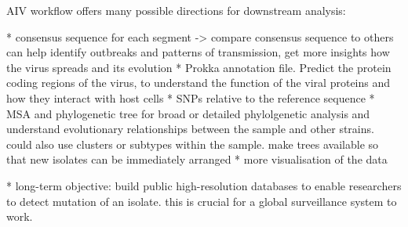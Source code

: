 AIV workflow offers many possible directions for downstream analysis:

* consensus sequence for each segment -> compare consensus sequence to others can help identify outbreaks and patterns of transmission, get more insights how the virus spreads and its evolution
* Prokka annotation file. Predict the protein coding regions of the virus, to understand the function of the viral proteins and how they interact with host cells
* SNPs relative to the reference sequence
* MSA and phylogenetic tree for broad or detailed phylolgenetic analysis and understand evolutionary relationships between the sample and other strains. could also use clusters or subtypes within the sample. make trees available so that new isolates can be immediately arranged
* more visualisation of the data

* long-term objective: build public high-resolution databases to enable researchers to detect mutation of an isolate. this is crucial for a global surveillance system to work.
